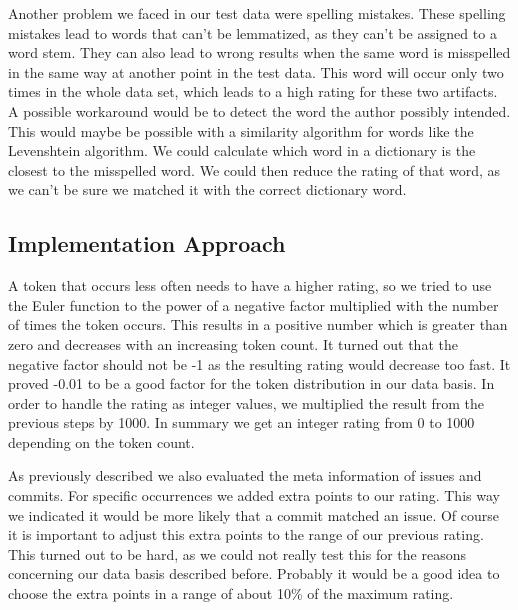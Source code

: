 Another problem we faced in our test data were spelling mistakes.
These spelling mistakes lead to words that can't be lemmatized, as they can't be assigned to a word stem.
They can also lead to wrong results when the same word is misspelled in the same way at another point in the test data.
This word will occur only two times in the whole data set, which leads to a high rating for these two artifacts.
A possible workaround would be to detect the word the author possibly intended.
This would maybe be possible with a similarity algorithm for words like the Levenshtein algorithm.
We could calculate which word in a dictionary is the closest to the misspelled word.
We could then reduce the rating of that word, as we can't be sure we matched it with the correct dictionary word.

\subsection{Implementation Approach}
A token that occurs less often needs to have a higher rating, so we tried to use the Euler function to the power of a negative factor multiplied with the number of times the token occurs.
This results in a positive number which is greater than zero and decreases with an increasing token count.
It turned out that the negative factor should not be -1 as the resulting rating would decrease too fast.
It proved -0.01 to be a good factor for the token distribution in our data basis.
In order to handle the rating as integer values, we multiplied the result from the previous steps by 1000.
In summary we get an integer rating from 0 to 1000 depending on the token count.

As previously described we also evaluated the meta information of issues and commits.
For specific occurrences we added extra points to our rating.
This way we indicated it would be more likely that a commit matched an issue.
Of course it is important to adjust this extra points to the range of our previous rating.
This turned out to be hard, as we could not really test this for the reasons concerning our data basis described before.
Probably it would be a good idea to choose the extra points in a range of about 10\% of the maximum rating.

